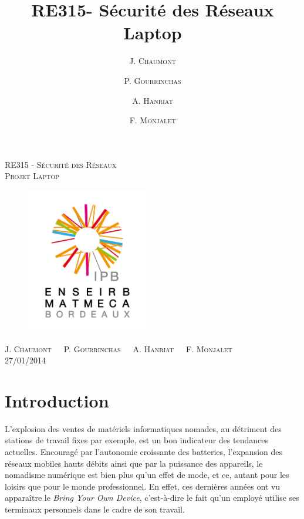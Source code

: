 \documentclass[12pt,a4paper]{article}
\author{J. \textsc{Chaumont} \and P. \textsc{Gourrinchas} \and \textsc{A. Hanriat} \and \textsc{F. Monjalet}}
\title{RE315- Sécurité des Réseaux\\Laptop}
\begin{document}
\thispagestyle{empty}
\begin{center}

\LARGE{\textsc{RE315 - Sécurité des Réseaux}}\\[0.8cm]
\Large{\textsc{Projet Laptop}}

\vspace*{0.5cm}

\begin{figure}[H]
	\begin{center}
		\includegraphics[width=200px]{img/logo.jpg}
	\end{center}
\end{figure}

\vspace*{0.3cm}
\Large{J. \textsc{Chaumont}\ \ \ P. \textsc{Gourrinchas}\ \ \ \textsc{A. Hanriat}\ \ \ \textsc{F. Monjalet}}\\
\vspace*{1cm}
\large{27/01/2014}



\end{center}

\clearpage
\tableofcontents
\clearpage


\section*{Introduction}

L'explosion des ventes de matériels informatiques nomades, au détriment des stations de travail fixes par exemple, est un bon indicateur des tendances actuelles. Encouragé par l'autonomie croissante des batteries, l'expansion des réseaux mobiles hauts débits ainsi que par la puissance des appareils, le nomadisme numérique est bien plus qu'un effet de mode, et ce, autant pour les loisirs que pour le monde professionnel. En effet, ces dernières années ont vu apparaître le \textit{Bring Your Own Device}, c'est-à-dire le fait qu'un employé utilise ses terminaux personnels dans le cadre de son travail.
\end{document}
